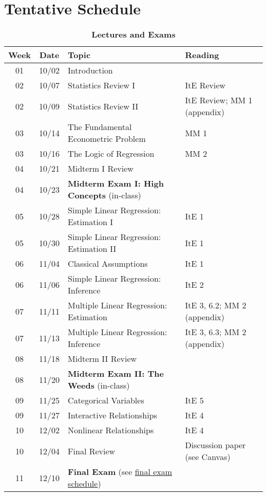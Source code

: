 \documentclass[10pt]{article}
\newcommand{\ra}[1]{\renewcommand{\arraystretch}{#1}}
\begin{document}
\newpage
\section*{Tentative Schedule}

\begin{table}[h!]
	\caption*{\large\textbf{Lectures and Exams}}
	\centering
	\ra{1.5}
	\begin{tabular}{@{\extracolsep{0.5cm}} c c l l @{}}
		\toprule
		\textbf{Week} & \textbf{Date} & \textbf{Topic} & \textbf{Reading}  \\ \toprule
		01 & 10/02 & Introduction & \\
		02 & 10/07 & Statistics Review I & ItE Review \\
		02 & 10/09 & Statistics Review II & ItE Review; MM 1 (appendix) \\
		03 & 10/14 & The Fundamental Econometric Problem & MM 1 \\
		03 & 10/16 & The Logic of Regression & MM 2  \\
		04 & 10/21 & Midterm I Review & \\ \midrule
		04 & 10/23 & \textbf{Midterm Exam I: High Concepts} (in-class) \\ \midrule
		05 & 10/28 & Simple Linear Regression: Estimation I & ItE 1  \\
		05 & 10/30 & Simple Linear Regression: Estimation II & ItE 1 \\
		06 & 11/04 & Classical Assumptions & ItE 1  \\
		06 & 11/06 & Simple Linear Regression: Inference & ItE 2 \\
		07 & 11/11 & Multiple Linear Regression: Estimation & ItE 3, 6.2; MM 2 (appendix) \\
		07 & 11/13 & Multiple Linear Regression: Inference & ItE 3, 6.3; MM 2 (appendix) \\
		08 & 11/18 & Midterm II Review &   \\ \midrule
		08 & 11/20 & \textbf{Midterm Exam II: The Weeds} (in-class) \\ \midrule
		09 & 11/25 & Categorical Variables & ItE 5  \\
		09 & 11/27 & Interactive Relationships & ItE 4  \\
		10 & 12/02 & Nonlinear Relationships & ItE 4  \\
		10 & 12/04 & Final Review &  Discussion paper (see Canvas) \\ \midrule
		11 & 12/10 & \textbf{Final Exam} (see \href{https://registrar.uoregon.edu/calendars/examinations#complete-final-exam-schedule}{final exam schedule}) \\
		\bottomrule
	\end{tabular}
\end{table}
\end{document}
